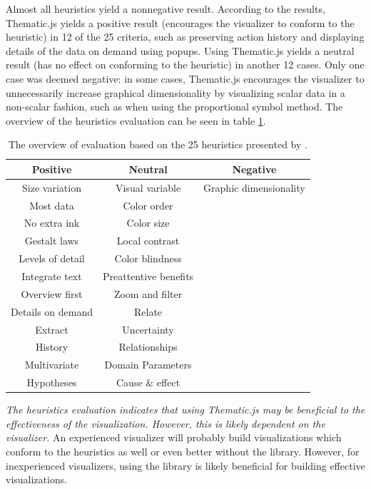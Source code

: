 Almost all heuristics yield a nonnegative result. According to the results, Thematic.js yields a positive result (encourages the visualizer to conform to the heuristic) in 12 of the 25 criteria, such as preserving action history and displaying details of the data on demand using popups. Using Thematic.js yields a neutral result (has no effect on conforming to the heuristic) in another 12 cases. Only one case was deemed negative: in some cases, Thematic.js encourages the visualizer to unnecessarily increase graphical dimensionality by visualizing scalar data in a non-scalar fashion, such as when using the proportional symbol method. The overview of the heuristics evaluation can be seen in table \ref{table:heuristicsevaluationoverview}.

\begin{table}[htb]
\centering
\begin{tabular}{|c|c|c|}
\hline
\textbf{Positive} & \textbf{Neutral} & \textbf{Negative} \\ 
\hline
Size variation & Visual variable & Graphic dimensionality \\
Most data & Color order & \\
No extra ink & Color size & \\
Gestalt laws & Local contrast & \\
Levels of detail & Color blindness & \\
Integrate text & Preattentive benefits & \\
Overview first & Zoom and filter & \\
Details on demand & Relate & \\
Extract & Uncertainty & \\
History & Relationships & \\
Multivariate & Domain Parameters & \\
Hypotheses & Cause \& effect & \\
\hline
\end{tabular}
\caption{The overview of evaluation based on the 25 heuristics presented by \citet{zuk_heuristics_2006}.}
\label{table:heuristicsevaluationoverview}
\end{table}

\emph{The heuristics evaluation indicates that using Thematic.js may be beneficial to the effectiveness of the visualization. However, this is likely dependent on the visualizer.} An experienced visualizer will probably build visualizations which conform to the heuristics as well or even better without the library. However, for inexperienced visualizers, using the library is likely beneficial for building effective visualizations. 

